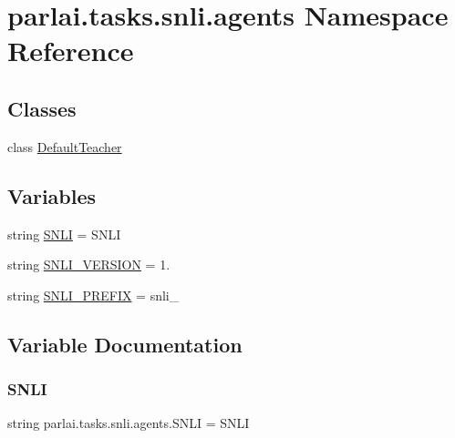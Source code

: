 \hypertarget{namespaceparlai_1_1tasks_1_1snli_1_1agents}{}\section{parlai.\+tasks.\+snli.\+agents Namespace Reference}
\label{namespaceparlai_1_1tasks_1_1snli_1_1agents}
\subsection*{Classes}
\begin{DoxyCompactItemize}
\item 
class \hyperlink{classparlai_1_1tasks_1_1snli_1_1agents_1_1DefaultTeacher}{Default\+Teacher}
\end{DoxyCompactItemize}
\subsection*{Variables}
\begin{DoxyCompactItemize}
\item 
string \hyperlink{namespaceparlai_1_1tasks_1_1snli_1_1agents_afad193b17008c0c816889726f837d488}{S\+N\+LI} = \textquotesingle{}S\+N\+LI\textquotesingle{}
\item 
string \hyperlink{namespaceparlai_1_1tasks_1_1snli_1_1agents_a3e12ae80ce316a320ad488a4f50cce28}{S\+N\+L\+I\+\_\+\+V\+E\+R\+S\+I\+ON} = \textquotesingle{}1.\textquotesingle{}
\item 
string \hyperlink{namespaceparlai_1_1tasks_1_1snli_1_1agents_a2df5af73bd9e97c56fb9a08b4a22ecef}{S\+N\+L\+I\+\_\+\+P\+R\+E\+F\+IX} = \textquotesingle{}snli\+\_\+\textquotesingle{}
\end{DoxyCompactItemize}


\subsection{Variable Documentation}
\mbox{\label{namespaceparlai_1_1tasks_1_1snli_1_1agents_afad193b17008c0c816889726f837d488}} 
\subsubsection{\texorpdfstring{S\+N\+LI}{SNLI}}
{\footnotesize\ttfamily string parlai.\+tasks.\+snli.\+agents.\+S\+N\+LI = \textquotesingle{}S\+N\+LI\textquotesingle{}}



